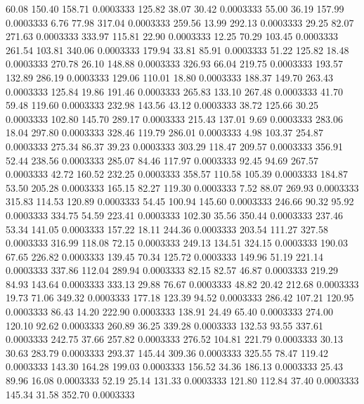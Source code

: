   60.08  150.40  158.71   0.0003333
 125.82   38.07   30.42   0.0003333
  55.00   36.19  157.99   0.0003333
   6.76   77.98  317.04   0.0003333
 259.56   13.99  292.13   0.0003333
  29.25   82.07  271.63   0.0003333
 333.97  115.81   22.90   0.0003333
  12.25   70.29  103.45   0.0003333
 261.54  103.81  340.06   0.0003333
 179.94   33.81   85.91   0.0003333
  51.22  125.82   18.48   0.0003333
 270.78   26.10  148.88   0.0003333
 326.93   66.04  219.75   0.0003333
 193.57  132.89  286.19   0.0003333
 129.06  110.01   18.80   0.0003333
 188.37  149.70  263.43   0.0003333
 125.84   19.86  191.46   0.0003333
 265.83  133.10  267.48   0.0003333
  41.70   59.48  119.60   0.0003333
 232.98  143.56   43.12   0.0003333
  38.72  125.66   30.25   0.0003333
 102.80  145.70  289.17   0.0003333
 215.43  137.01    9.69   0.0003333
 283.06   18.04  297.80   0.0003333
 328.46  119.79  286.01   0.0003333
   4.98  103.37  254.87   0.0003333
 275.34   86.37   39.23   0.0003333
 303.29  118.47  209.57   0.0003333
 356.91   52.44  238.56   0.0003333
 285.07   84.46  117.97   0.0003333
  92.45   94.69  267.57   0.0003333
  42.72  160.52  232.25   0.0003333
 358.57  110.58  105.39   0.0003333
 184.87   53.50  205.28   0.0003333
 165.15   82.27  119.30   0.0003333
   7.52   88.07  269.93   0.0003333
 315.83  114.53  120.89   0.0003333
  54.45  100.94  145.60   0.0003333
 246.66   90.32   95.92   0.0003333
 334.75   54.59  223.41   0.0003333
 102.30   35.56  350.44   0.0003333
 237.46   53.34  141.05   0.0003333
 157.22   18.11  244.36   0.0003333
 203.54  111.27  327.58   0.0003333
 316.99  118.08   72.15   0.0003333
 249.13  134.51  324.15   0.0003333
 190.03   67.65  226.82   0.0003333
 139.45   70.34  125.72   0.0003333
 149.96   51.19  221.14   0.0003333
 337.86  112.04  289.94   0.0003333
  82.15   82.57   46.87   0.0003333
 219.29   84.93  143.64   0.0003333
 333.13   29.88   76.67   0.0003333
  48.82   20.42  212.68   0.0003333
  19.73   71.06  349.32   0.0003333
 177.18  123.39   94.52   0.0003333
 286.42  107.21  120.95   0.0003333
  86.43   14.20  222.90   0.0003333
 138.91   24.49   65.40   0.0003333
 274.00  120.10   92.62   0.0003333
 260.89   36.25  339.28   0.0003333
 132.53   93.55  337.61   0.0003333
 242.75   37.66  257.82   0.0003333
 276.52  104.81  221.79   0.0003333
  30.13   30.63  283.79   0.0003333
 293.37  145.44  309.36   0.0003333
 325.55   78.47  119.42   0.0003333
 143.30  164.28  199.03   0.0003333
 156.52   34.36  186.13   0.0003333
  25.43   89.96   16.08   0.0003333
  52.19   25.14  131.33   0.0003333
 121.80  112.84   37.40   0.0003333
 145.34   31.58  352.70   0.0003333
